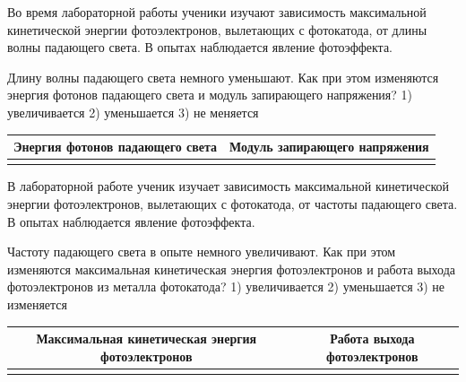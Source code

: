 \begin{taskbasic}[code={\label{task:photo_lambda_dec_ephoton_and_u}}]
Во время лабораторной работы ученики изучают зависимость максимальной кинетической энергии фотоэлектронов, вылетающих с фотокатода, от длины волны падающего света. В опытах наблюдается явление фотоэффекта.

Длину волны падающего света немного уменьшают. Как при этом изменяются энергия фотонов падающего света и модуль запирающего напряжения?
1) увеличивается
2) уменьшается
3) не меняется

\nopagebreak\smallskip
\begin{center}
\small
\begin{tabular}{|c|c|}
\hline
Энергия фотонов падающего света & Модуль запирающего напряжения \\ \hline
 & \\ \hline
\end{tabular}
\end{center}

\end{taskbasic}

\begin{taskbasic}[code={\label{task:photo_freq_inc_ek_and_work}}]
В лабораторной работе ученик изучает зависимость максимальной кинетической энергии фотоэлектронов, вылетающих с фотокатода, от частоты падающего света. В опытах наблюдается явление фотоэффекта.

Частоту падающего света в опыте немного увеличивают. Как при этом изменяются максимальная кинетическая энергия фотоэлектронов и работа выхода фотоэлектронов из металла фотокатода?
1) увеличивается
2) уменьшается
3) не изменяется

\nopagebreak\smallskip
\begin{center}
\small
\begin{tabular}{|c|c|}
\hline
Максимальная кинетическая энергия фотоэлектронов & Работа выхода фотоэлектронов \\ \hline
 & \\ \hline
\end{tabular}
\end{center}

\end{taskbasic}

